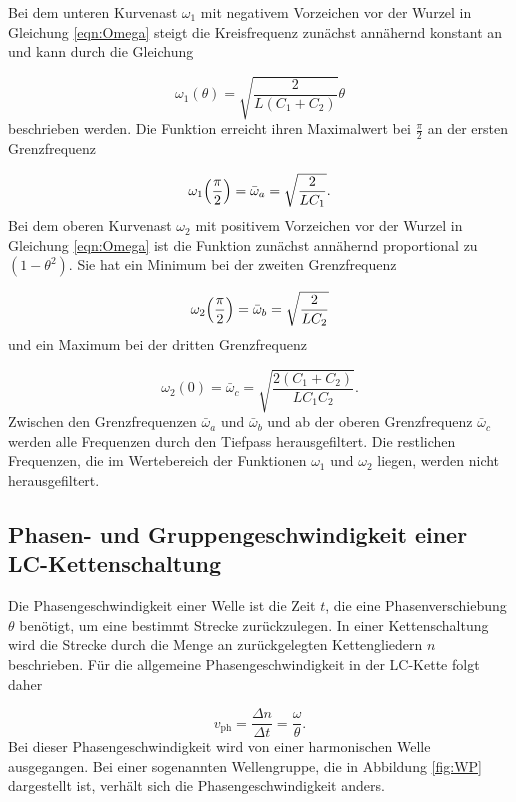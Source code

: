 Bei dem unteren Kurvenast $\omega_1$ mit negativem Vorzeichen vor der Wurzel
in Gleichung \eqref{eqn:Omega}
steigt die Kreisfrequenz zunächst annähernd konstant an und kann durch die
Gleichung

\begin{equation}
  \omega_1 (\theta) = \sqrt{\frac{2}{L(C_1 + C_2)}} \theta
\end{equation}
beschrieben werden.
Die Funktion erreicht ihren Maximalwert bei $\frac{\pi}{2}$ an
der ersten Grenzfrequenz

\begin{equation}
  \omega_1\Bigl(\frac{\pi}{2}\Bigr) = \bar{\omega}_a = \sqrt{\frac{2}{LC_1}}.
\end{equation}
Bei dem oberen Kurvenast $\omega_2$ mit positivem Vorzeichen vor der Wurzel in
Gleichung \eqref{eqn:Omega} ist die Funktion zunächst annähernd
proportional zu $(1-\theta^2)$.
Sie hat ein Minimum bei der zweiten Grenzfrequenz

\begin{equation}
  \omega_2\Bigl(\frac{\pi}{2}\Bigr) = \bar{\omega}_b = \sqrt{\frac{2}{LC_2}}
\end{equation}
und ein Maximum bei der dritten Grenzfrequenz

\begin{equation}
  \omega_2(0) = \bar{\omega}_c = \sqrt{\frac{2(C_1+C_2)}{LC_1C_2}}.
\end{equation}
Zwischen den Grenzfrequenzen $\bar{\omega}_a$ und $\bar{\omega}_b$ und ab der
oberen Grenzfrequenz $\bar{\omega}_c$ werden alle Frequenzen durch den
Tiefpass herausgefiltert. Die restlichen Frequenzen, die im Wertebereich der
Funktionen $\omega_1$ und $\omega_2$ liegen, werden nicht herausgefiltert.


\subsection{Phasen- und Gruppengeschwindigkeit einer LC-Kettenschaltung}

Die Phasengeschwindigkeit einer Welle ist die Zeit $t$, die eine
Phasenverschiebung $\theta$ benötigt, um eine bestimmt Strecke zurückzulegen.
In einer Kettenschaltung wird die Strecke durch die Menge an zurückgelegten
Kettengliedern $n$ beschrieben.
Für die allgemeine Phasengeschwindigkeit in der LC-Kette folgt daher

\begin{equation}
  v_\text{ph} = \frac{\Delta n}{\Delta t} = \frac{\omega}{\theta}.
\end{equation}
Bei dieser Phasengeschwindigkeit wird von einer harmonischen Welle ausgegangen.
Bei einer sogenannten Wellengruppe, die in Abbildung \ref{fig:WP} dargestellt
ist, verhält sich die Phasengeschwindigkeit anders.

